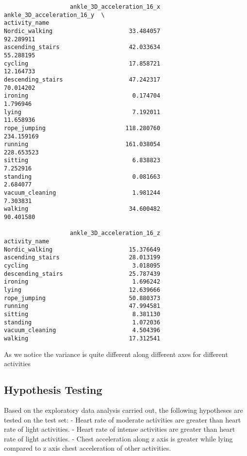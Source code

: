 \documentclass[11pt]{article}
\begin{document}
\begin{verbatim}
                   ankle_3D_acceleration_16_x  ankle_3D_acceleration_16_y  \
activity_name                                                               
Nordic_walking                      33.484057                   92.289911   
ascending_stairs                    42.033634                   55.288195   
cycling                             17.858721                   12.164733   
descending_stairs                   47.242317                   70.014202   
ironing                              0.174704                    1.796946   
lying                                7.192011                   11.658936   
rope_jumping                       118.280760                  234.159169   
running                            161.038054                  228.653523   
sitting                              6.838823                    7.252916   
standing                             0.081663                    2.684077   
vacuum_cleaning                      1.981244                    7.303831   
walking                             34.600482                   90.401580   

                   ankle_3D_acceleration_16_z  
activity_name                                  
Nordic_walking                      15.376649  
ascending_stairs                    28.013199  
cycling                              3.018095  
descending_stairs                   25.787439  
ironing                              1.696242  
lying                               12.639666  
rope_jumping                        50.880373  
running                             47.994581  
sitting                              8.381130  
standing                             1.072036  
vacuum_cleaning                      4.504396  
walking                             17.312541  
    \end{verbatim}

    
    As we notice the variance is quite different along different axes for
different activities

    \hypertarget{hypothesis-testing}{%
\subsection{Hypothesis Testing}\label{hypothesis-testing}}

    Based on the exploratory data analysis carried out, the following
hypotheses are tested on the test set: - Heart rate of moderate
activities are greater than heart rate of light activities. - Heart rate
of intense activities are greater than heart rate of light activities. -
Chest acceleration along z axis is greater while lying compared to z
axis chest acceleration of other activities.
\end{document}

